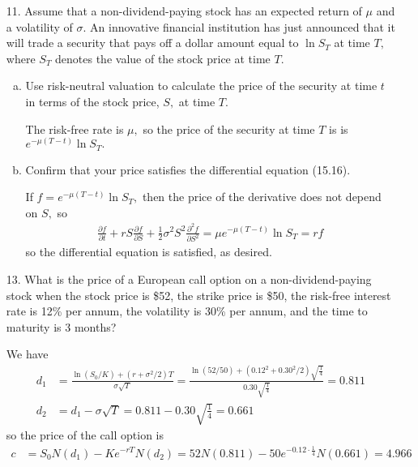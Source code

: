 \documentclass{article}
\begin{document}
\begin{itemize}
	\item[11.] Assume that a non-dividend-paying stock has an expected return of $\mu$ and a volatility of $\sigma.$ An innovative financial institution has just announced that it will trade a security that pays off a dollar amount equal to $\ln S_T$ at time $T,$ where $S_T$ denotes the value of the stock price at time $T.$
		\begin{enumerate}[(a)]
			\item Use risk-neutral valuation to calculate the price of the security at time $t$ in terms of the stock price, $S,$ at time $T.$
				\begin{soln}
					The risk-free rate is $\mu,$ so the price of the security at time $T$ is is $e^{-\mu (T-t)}\ln S_T.$
				\end{soln}

			\item Confirm that your price satisfies the differential equation (15.16).
				\begin{soln}
					If $f=e^{-\mu(T-t)}\ln S_T,$ then the price of the derivative does not depend on $S,$ so
					\begin{align*}
						\frac{\partial f}{\partial t} + rS\frac{\partial f}{\partial S} + \frac{1}{2}\sigma^2S^2\frac{\partial^2 f}{\partial S^2} = \mu e^{-\mu(T-t)} \ln S_T = rf
					\end{align*}
					so the differential equation is satisfied, as desired.
				\end{soln}
				
		\end{enumerate}

	\item[13.] What is the price of a European call option on a non-dividend-paying stock when the stock price is \$52, the strike price is \$50, the risk-free interest rate is 12\% per annum, the volatility is 30\% per annum, and the time to maturity is 3 months?
		\begin{soln}
			We have
			\begin{align*}
				d_1 &= \frac{\ln(S_0/K) + (r+\sigma^2/2)T}{\sigma\sqrt{T}} = \frac{\ln(52/50) + (0.12^2+0.30^2/2)\sqrt{\frac{1}{4}}}{0.30\sqrt{\frac{1}{4}}} = 0.811 \\
				d_2 &= d_1 - \sigma\sqrt{T} = 0.811-0.30\sqrt{\frac{1}{4}} = 0.661
			\end{align*}
			so the price of the call option is
			\begin{align*}
				c &= S_0N(d_1) - Ke^{-rT}N(d_2) = 52N(0.811) - 50e^{-0.12\cdot \frac{1}{4}}N(0.661) = \boxed{4.966}
			\end{align*}
		\end{soln}


\end{itemize}
\end{document}
